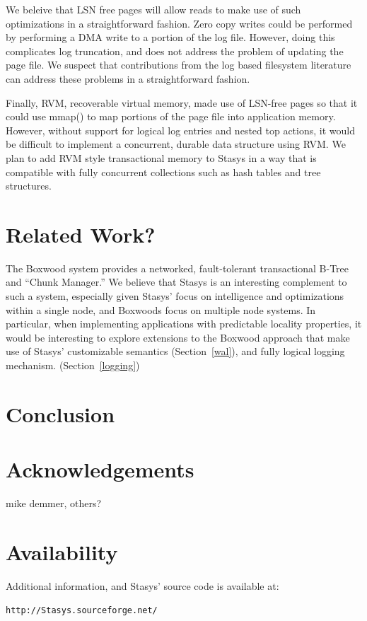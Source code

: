 \documentclass[letterpaper,twocolumn,10pt]{article}
\newcommand{\yad}{Stasys\xspace}
\newcommand{\yads}{Stasys'\xspace}
\begin{document}
We beleive that LSN free pages will allow reads to make use of such
optimizations in a straightforward fashion.  Zero copy writes could be
performed by performing a DMA write to a portion of the log file.
However, doing this complicates log truncation, and does not address
the problem of updating the page file.  We suspect that contributions
from the log based filesystem literature can address these problems in
a straightforward fashion.

Finally, RVM, recoverable virtual memory, made use of LSN-free pages
so that it could use mmap() to map portions of the page file into
application memory.  However, without support for logical log entries
and nested top actions, it would be difficult to implement a
concurrent, durable data structure using RVM.  We plan to add RVM
style transactional memory to \yad in a way that is compatible with
fully concurrent collections such as hash tables and tree structures.


\section{Related Work?}

The Boxwood system provides a networked, fault-tolerant transactional
B-Tree and ``Chunk Manager.''  We believe that \yad is an interesting
complement to such a system, especially given \yads focus on
intelligence and optimizations within a single node, and Boxwoods
focus on multiple node systems.  In particular, when implementing
applications with predictable locality properties, it would be
interesting to explore extensions to the Boxwood approach that make
use of \yads customizable semantics (Section~\ref{wal}), and fully logical logging
mechanism. (Section~\ref{logging})

\section{Conclusion}

\section{Acknowledgements}

mike demmer, others?

\section{Availability}

Additional information, and \yads source code is available at:

\begin{center}
{\tt http://\yad.sourceforge.net/}
\end{center}

{\footnotesize 
\nocite{*}
}

\theendnotes
\end{document}
